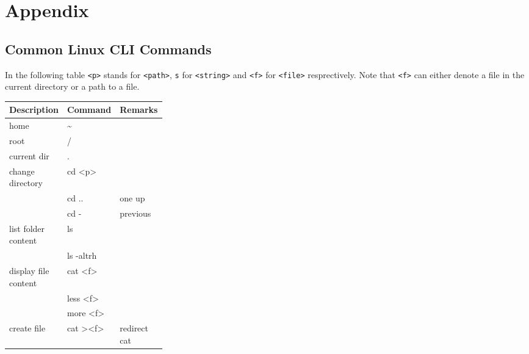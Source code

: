 \section{Appendix}
\subsection{Common Linux CLI Commands}
In the following table \texttt{<p>} stands for \texttt{<path>}, \texttt{s} for \texttt{<string>} and \texttt{<f>} for \texttt{<file>} resprectively. Note that \texttt{<f>} can either denote a file in the current directory or a path to a file.\\
\renewcommand{\arraystretch}{1.1}
\setlength\tabcolsep{3pt} %
{\small %
    \begin{tabularx}{\linewidth}{@{} l>{\ttfamily}lp{0.3\linewidth} @{}}
        \toprule
        Description          & \normalfont Command        & Remarks                          \\
        \midrule
        home                 & \textasciitilde{}          &                                  \\
        root                 & /                          &                                  \\
        current dir          & .                          &                                  \\
        change directory     & cd <p>                     &                                  \\
                             & cd ..                      & one up                           \\
                             & cd -                       & previous                         \\
        list folder content  & ls                         &                                  \\
                             & ls -altrh                  &                                  \\
        display file content & cat <f>                    &                                  \\
                             & less <f>                   &                                  \\
                             & more <f>                   &                                  \\
        create file          & cat ><f>                   & redirect cat                     \\

\end{tabularx}}

